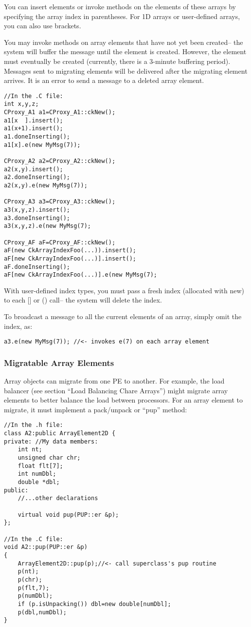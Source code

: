 You can insert elements or invoke methods on the elements of these
arrays by specifying the array index in parentheses.  For 1D 
arrays or user-defined arrays, you can also use brackets.

You may invoke methods on array elements that have not yet
been created-- the system will buffer the message until the
element is created.  However, the element must eventually be 
created (currently, there is a 3-minute buffering period).
Messages sent to migrating elements will be delivered after
the migrating element arrives.  It is an error to send 
a message to a deleted array element.

\begin{verbatim}
//In the .C file:
int x,y,z;
CProxy_A1 a1=CProxy_A1::ckNew();
a1[x  ].insert(); 
a1(x+1).insert();
a1.doneInserting();
a1[x].e(new MyMsg(7));

CProxy_A2 a2=CProxy_A2::ckNew(); 
a2(x,y).insert();
a2.doneInserting();
a2(x,y).e(new MyMsg(7));

CProxy_A3 a3=CProxy_A3::ckNew();
a3(x,y,z).insert();
a3.doneInserting();
a3(x,y,z).e(new MyMsg(7);

CProxy_AF aF=CProxy_AF::ckNew();
aF(new CkArrayIndexFoo(...)).insert();
aF[new CkArrayIndexFoo(...)].insert();
aF.doneInserting();
aF[new CkArrayIndexFoo(...)].e(new MyMsg(7);

\end{verbatim}
With user-defined index types, you must pass a fresh index 
(allocated with new) to each [] or () call-- the system will delete
the index.

To broadcast a message to all the current elements of an array, 
simply omit the index, as:

\begin{verbatim}
a3.e(new MyMsg(7)); //<- invokes e(7) on each array element
\end{verbatim}

\subsubsection{Migratable Array Elements}
Array objects can migrate from one PE to another.
For example, the load balancer (see section ``Load Balancing Chare Arrays'')
might migrate array elements to better balance the load between
processors.  For an array element to migrate, it must implement
a pack/unpack or ``pup'' method:

\begin{verbatim}
//In the .h file:
class A2:public ArrayElement2D {
private: //My data members:
    int nt;
    unsigned char chr;
    float flt[7];
    int numDbl;
    double *dbl;
public:	
    //...other declarations

    virtual void pup(PUP::er &p);
};

//In the .C file:
void A2::pup(PUP::er &p)
{
    ArrayElement2D::pup(p);//<- call superclass's pup routine
    p(nt);
    p(chr);
    p(flt,7);
    p(numDbl);
    if (p.isUnpacking()) dbl=new double[numDbl];
    p(dbl,numDbl);
}
\end{verbatim}


